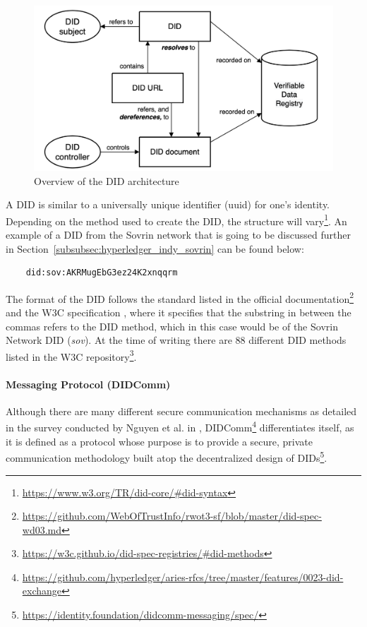 \begin{figure}[t]
    \centering
    \includegraphics[width=0.6\linewidth]{images/did_brief_architecture_overview.png}
    \caption[Overview of DID architecture]{Overview of the DID architecture \cite{Longley:21:DI}}
    \label{fig:DID_architecture}
\end{figure}

A DID is similar to a universally unique identifier (uuid) for one's identity. Depending on the method used to create the DID, the structure will vary\footnote{\url{https://www.w3.org/TR/did-core/\#did-syntax}}. An example of a DID from the Sovrin network that is going to be discussed further in Section~\ref{subsubsec:hyperledger_indy_sovrin} can be found below:

\begin{verbatim}
    did:sov:AKRMugEbG3ez24K2xnqqrm
\end{verbatim}

The format of the DID follows the standard listed in the official documentation\footnote{\url{https://github.com/WebOfTrustInfo/rwot3-sf/blob/master/did-spec-wd03.md}} and the W3C specification \cite{Sabadello:21:DI}, where it specifies that the substring in between the commas refers to the DID method, which in this case would be of the Sovrin Network DID (\textit{sov}). At the time of writing there are 88 different DID methods listed in the W3C repository\footnote{\url{https://w3c.github.io/did-spec-registries/\#did-methods}}.

\paragraph{Messaging Protocol (DIDComm)}
\label{subsubsec:didcomm}

Although there are many different secure communication mechanisms as detailed in the survey conducted by Nguyen et al. in \cite{nguyen2015survey}, \acrfull{DIDComm}\footnote{\url{https://github.com/hyperledger/aries-rfcs/tree/master/features/0023-did-exchange}} differentiates itself, as it is defined as a protocol whose purpose is to provide a secure, private communication methodology built atop the decentralized design of DIDs\footnote{\url{https://identity.foundation/didcomm-messaging/spec/}}.

